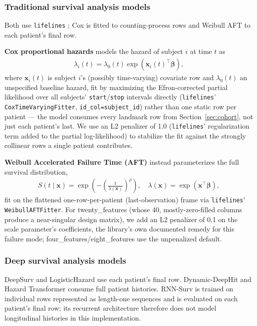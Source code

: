 \subsubsection{Traditional survival analysis models}
Both use \texttt{lifelines} \citep{davidson2019lifelines}; Cox is fitted to counting-process rows and Weibull AFT to each patient's final row.

\textbf{Cox proportional hazards} \citep{cox1972regression} models the hazard of subject $i$ at time $t$ as
\begin{align}
\lambda_i(t) = \lambda_0(t)\exp(\boldsymbol{x}_i(t)^\intercal\boldsymbol{\beta}),
\end{align}
where $\boldsymbol{x}_i(t)$ is subject $i$'s (possibly time-varying) covariate row and $\lambda_0(t)$ an unspecified baseline hazard, fit by maximizing the Efron-corrected partial likelihood over all subjects' \texttt{start}/\texttt{stop} intervals directly (\texttt{lifelines}' \texttt{CoxTimeVaryingFitter}, \texttt{id\_col=subject\_id}) rather than one static row per patient — the model consumes every landmark row from Section~\ref{sec:cohort}, not just each patient's last. We use an L2 penalizer of 1.0 (\texttt{lifelines}' regularization term added to the partial log-likelihood) to stabilize the fit against the strongly collinear rows a single patient contributes.

\textbf{Weibull Accelerated Failure Time (AFT)} \citep{anderson1991nonproportional_weibull} instead parameterizes the full survival distribution,
\begin{align}
S(t\mid\boldsymbol{x}) = \exp\!\left(-\left(\frac{t}{\lambda(\boldsymbol{x})}\right)^{\rho}\right), \quad \lambda(\boldsymbol{x}) = \exp(\boldsymbol{x}^\intercal\boldsymbol{\beta}),
\end{align}
fit on the flattened one-row-per-patient (last-observation) frame via \texttt{lifelines}' \texttt{WeibullAFTFitter}. For twenty\_features (whose 40, mostly-zero-filled columns produce a near-singular design matrix), we add an L2 penalizer of 0.1 on the scale parameter's coefficients, the library's own documented remedy for this failure mode; four\_features/eight\_features use the unpenalized default.

\subsubsection{Deep survival analysis models}
DeepSurv and LogisticHazard use each patient's final row. Dynamic-DeepHit and Hazard Transformer consume full patient histories. RNN-Surv is trained on individual rows represented as length-one sequences and is evaluated on each patient's final row; its recurrent architecture therefore does not model longitudinal histories in this implementation.

